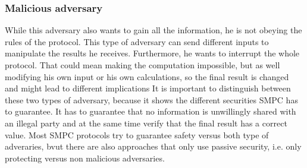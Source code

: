 \documentclass[english,runningheads,a4paper]{llncs}[2018/03/10]
\begin{document}
\subsubsection{Malicious adversary}
While this adversary also wants to gain all the information, he is not obeying the rules of the protocol. This type of adversary can send different inputs to manipulate the results he receives. Furthermore, he wants to interrupt the whole protocol. That could mean making the computation impossible, but as well modifying his own input or his own calculations, so the final result is changed and might lead to different implications
It is important to distinguish between these two types of adversary, because it shows the different securities SMPC has to guarantee. It has to guarantee that no information is unwillingly shared with an illegal party and at the same time verify that the final result has a correct value. Most SMPC protocols try to guarantee safety versus both type of adveraries, bvut there are also approaches that only use passive security, i.e. only protecting versus non malicious adversaries.
\end{document}
